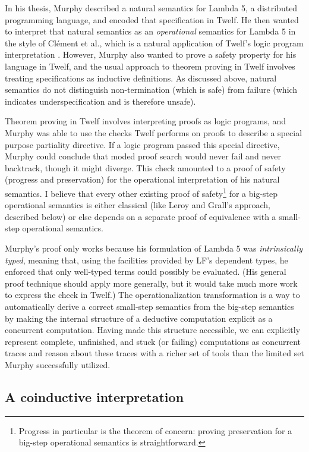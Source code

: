 In his thesis, Murphy described a natural semantics for Lambda 5, a
distributed programming language, and encoded that specification in
Twelf. He then wanted to interpret that natural semantics as an {\it
  operational} semantics for Lambda 5 in the style of Cl\'ement et
al., which is a natural application of Twelf's logic program
interpretation \cite{michaylov91natural}.  However, Murphy also wanted
to prove a safety property for his language in Twelf, and the usual
approach to theorem proving in Twelf involves treating specifications
as inductive definitions. As discussed above, natural semantics do not
distinguish non-termination (which is safe) from failure (which
indicates underspecification and is therefore unsafe).

Theorem proving in Twelf involves interpreting proofs as logic
programs, and Murphy was able to use the checks Twelf performs on
proofs to describe a special purpose partiality directive. If a logic
program passed this special directive, Murphy could conclude that
moded proof search would never fail and never backtrack, though it
might diverge. This check amounted to a proof of safety (progress and
preservation) for the operational interpretation of his natural
semantics. I believe that every other existing proof of
safety\footnote{Progress in particular is the theorem of concern:
  proving preservation for a big-step operational semantics is
  straightforward.} for a big-step operational semantics is either
classical (like Leroy and Grall's approach, described below) or else
depends on a separate proof of equivalence with a small-step
operational semantics.

Murphy's proof only works because his formulation of Lambda 5 was {\it
  intrinsically typed}, meaning that, using the facilities provided by
LF's dependent types, he enforced that only well-typed terms could
possibly be evaluated. (His general proof technique should apply more
generally, but it would take much more work to express the check in
Twelf.)  The operationalization transformation is a way to
automatically derive a correct small-step semantics from the big-step
semantics by making the internal structure of a deductive computation
explicit as a concurrent computation. Having made this structure
accessible, we can explicitly represent complete, unfinished, and
stuck (or failing) computations as concurrent traces and reason about
these traces with a richer set of tools than the limited set Murphy
successfully utilized.

\subsection*{A coinductive interpretation}


